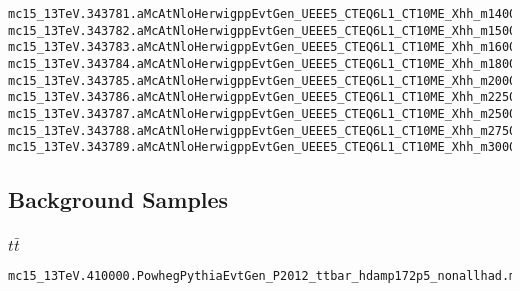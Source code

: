 \begin{scriptsize}
\begin{verbatim}
mc15_13TeV.343781.aMcAtNloHerwigppEvtGen_UEEE5_CTEQ6L1_CT10ME_Xhh_m1400_wwbb.merge.DAOD_HIGG5D2.e5153_a766_a821_r7676_p2949
mc15_13TeV.343782.aMcAtNloHerwigppEvtGen_UEEE5_CTEQ6L1_CT10ME_Xhh_m1500_wwbb.merge.DAOD_HIGG5D2.e5153_a766_a821_r7676_p2949
mc15_13TeV.343783.aMcAtNloHerwigppEvtGen_UEEE5_CTEQ6L1_CT10ME_Xhh_m1600_wwbb.merge.DAOD_HIGG5D2.e5153_a766_a821_r7676_p2949
mc15_13TeV.343784.aMcAtNloHerwigppEvtGen_UEEE5_CTEQ6L1_CT10ME_Xhh_m1800_wwbb.merge.DAOD_HIGG5D2.e5153_a766_a821_r7676_p2949
mc15_13TeV.343785.aMcAtNloHerwigppEvtGen_UEEE5_CTEQ6L1_CT10ME_Xhh_m2000_wwbb.merge.DAOD_HIGG5D2.e5153_a766_a821_r7676_p2949
mc15_13TeV.343786.aMcAtNloHerwigppEvtGen_UEEE5_CTEQ6L1_CT10ME_Xhh_m2250_wwbb.merge.DAOD_HIGG5D2.e5153_a766_a821_r7676_p2949
mc15_13TeV.343787.aMcAtNloHerwigppEvtGen_UEEE5_CTEQ6L1_CT10ME_Xhh_m2500_wwbb.merge.DAOD_HIGG5D2.e5153_a766_a821_r7676_p2949
mc15_13TeV.343788.aMcAtNloHerwigppEvtGen_UEEE5_CTEQ6L1_CT10ME_Xhh_m2750_wwbb.merge.DAOD_HIGG5D2.e5153_a766_a821_r7676_p2949
mc15_13TeV.343789.aMcAtNloHerwigppEvtGen_UEEE5_CTEQ6L1_CT10ME_Xhh_m3000_wwbb.merge.DAOD_HIGG5D2.e5153_a766_a821_r7676_p2949
\end{verbatim}

\subsection{Background Samples}
\subsubsection{$t\bar t$}
\fontsize{7}{9} \selectfont%
\begin{verbatim} 
mc15_13TeV.410000.PowhegPythiaEvtGen_P2012_ttbar_hdamp172p5_nonallhad.merge.DAOD_HIGG5D2.e3698_s2608_s2183_r7725_r7676_p2949
\end{verbatim}


\end{scriptsize}
